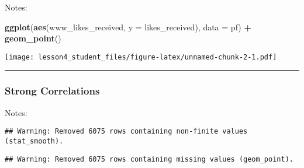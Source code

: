 \documentclass[]{article}
\newenvironment{Shaded}{\begin{snugshade}}{\end{snugshade}}
\newcommand{\KeywordTok}[1]{\textcolor[rgb]{0.13,0.29,0.53}{\textbf{#1}}}
\newcommand{\DataTypeTok}[1]{\textcolor[rgb]{0.13,0.29,0.53}{#1}}
\newcommand{\DecValTok}[1]{\textcolor[rgb]{0.00,0.00,0.81}{#1}}
\newcommand{\FloatTok}[1]{\textcolor[rgb]{0.00,0.00,0.81}{#1}}
\newcommand{\StringTok}[1]{\textcolor[rgb]{0.31,0.60,0.02}{#1}}
\newcommand{\OperatorTok}[1]{\textcolor[rgb]{0.81,0.36,0.00}{\textbf{#1}}}
\newcommand{\NormalTok}[1]{#1}
\begin{document}
Notes:

\begin{Shaded}
\begin{Highlighting}[]
\KeywordTok{ggplot}\NormalTok{(}\KeywordTok{aes}\NormalTok{(www_likes_received, }\DataTypeTok{y =}\NormalTok{ likes_received), }\DataTypeTok{data =}\NormalTok{ pf) }\OperatorTok{+}
\StringTok{  }\KeywordTok{geom_point}\NormalTok{()}
\end{Highlighting}
\end{Shaded}

\texttt{[image: lesson4\_student\_files/figure-latex/unnamed-chunk-2-1.pdf]}

\begin{center}\rule{0.5\linewidth}{\linethickness}\end{center}

\subsubsection{Strong Correlations}\label{strong-correlations}

Notes:

\begin{Shaded}
\end{Shaded}

\begin{verbatim}
## Warning: Removed 6075 rows containing non-finite values (stat_smooth).
\end{verbatim}

\begin{verbatim}
## Warning: Removed 6075 rows containing missing values (geom_point).
\end{verbatim}
\end{document}
